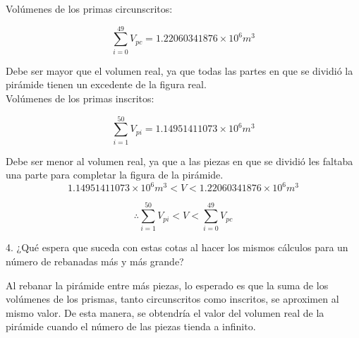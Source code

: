 \documentclass[12pt]{article}
\begin{document}
Volúmenes de los primas circunscritos: 

\[
\sum_{i=0}^{49} V_{pc} = 1.22060341876 \times 10^6 m^3  
\]

Debe ser mayor que el volumen real, ya que todas las partes en que se dividió la pirámide tienen un excedente de la figura real.\\

Volúmenes de los primas inscritos:

\[
\sum_{i=1}^{50} V_{pi} = 1.14951411073 \times 10^6 m^3
\]

Debe ser menor al volumen real, ya que a las piezas en que se dividió les faltaba una parte para completar la figura de la pirámide. \\

\[
1.14951411073 \times 10^6 m^3 < V < 1.22060341876 \times 10^6 m^3 
\]

\[
\therefore \sum_{i=1}^{50} V_{pi} < V < \sum_{i=0}^{49} V_{pc}
\]

4. ¿Qué espera que suceda con estas cotas al hacer los mismos cálculos para un número de rebanadas más y más grande? 

Al rebanar la pirámide entre más piezas, lo esperado es que la suma de los volúmenes de los prismas, tanto circunscritos como inscritos, se aproximen al mismo valor. De esta manera, se obtendría el valor del volumen real de la pirámide cuando el número de las piezas tienda a infinito.
\clearpage

\end{document}
